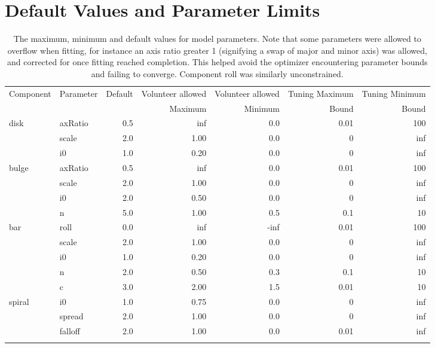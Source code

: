\documentclass[../main.tex]{subfiles}
\begin{document}
\section{Default Values and Parameter Limits}
\begin{table*}
  \centering
  \begin{tabular}{l|l|r|r|r|r|r}
\hline
Component & Parameter &  Default &  Volunteer allowed &  Volunteer allowed & Tuning Maximum & Tuning Minimum \\
 &  &   &  Maximum &  Minimum & Bound & Bound \\
\hline
disk & axRatio &      0.5 &      inf &      0.0 & 0.01 & 100 \\
       & scale &      2.0 &     1.00 &      0.0 & 0 & inf \\
       & i0 &      1.0 &     0.20 &      0.0 & 0 & inf \\
bulge & axRatio &      0.5 &      inf &      0.0 & 0.01 & 100 \\
       & scale &      2.0 &     1.00 &      0.0 & 0 & inf \\
       & i0 &      2.0 &     0.50 &      0.0 & 0 & inf   \\
       & n &      5.0 &     1.00 &      0.5 & 0.1 & 10 \\
bar & roll &      0.0 &      inf &     -inf & 0.01 & 100 \\
       & scale &      2.0 &     1.00 &      0.0 & 0 & inf \\
       & i0 &      1.0 &     0.20 &      0.0 & 0 & inf   \\
       & n &      2.0 &     0.50 &      0.3 & 0.1 & 10 \\
       & c &      3.0 &     2.00 &      1.5 & 0.01 & 10 \\
spiral & i0 &      1.0 &     0.75 &      0.0 & 0 & inf   \\
       & spread &      2.0 &     1.00 &      0.0 & 0 & inf   \\
       & falloff &      2.0 &     1.00 &      0.0 & 0.01 & inf   \\
\hline
  \centering
  \end{tabular}
  \caption{The maximum, minimum and default values for model parameters. Note that some parameters were allowed to overflow when fitting, for instance an axis ratio greater 1 (signifying a swap of major and minor axis) was allowed, and corrected for once fitting reached completion. This helped avoid the optimizer encountering parameter bounds and failing to converge. Component roll was similarly unconstrained.}
  \label{table:bad_values}
\end{table*}
\end{document}
